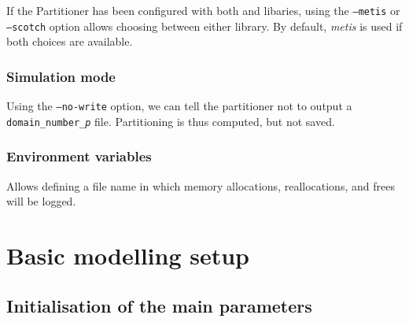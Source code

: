{{If the Partitioner has been configured with both \metis and
\scotch libaries, using the \texttt{--metis} or \texttt{--scotch}
option allows choosing between either library. By default, \emph{metis} is
used if both choices are available.

\subsubsection{Simulation mode\label{sec:optpart:nowrite}}

Using the \texttt{--no-write} option, we can tell the partitioner
not to output a {\tt domain\_number\_\it{p}} file.
Partitioning is thus computed, but not saved.

\subsubsection{Environment variables\label{sec:optpart:envvar}}


Allows defining a file name in which memory allocations, reallocations,
and frees will be logged.


\section{Basic modelling setup}

\subsection{Initialisation of the main parameters}

}}
